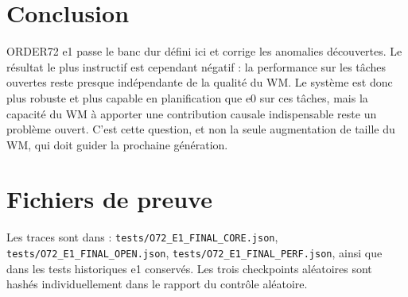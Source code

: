 \documentclass[11pt,a4paper]{article}
\begin{document}
\section{Conclusion}
ORDER72 e1 passe le banc dur défini ici et corrige les anomalies découvertes. Le résultat le plus instructif est cependant négatif : la performance sur les tâches ouvertes reste presque indépendante de la qualité du WM. Le système est donc plus robuste et plus capable en planification que e0 sur ces tâches, mais la capacité du WM à apporter une contribution causale indispensable reste un problème ouvert. C'est cette question, et non la seule augmentation de taille du WM, qui doit guider la prochaine génération.
\appendix
\section{Fichiers de preuve}
Les traces sont dans : \texttt{tests/O72\_E1\_FINAL\_CORE.json}, \texttt{tests/O72\_E1\_FINAL\_OPEN.json}, \texttt{tests/O72\_E1\_FINAL\_PERF.json}, ainsi que dans les tests historiques e1 conservés. Les trois checkpoints aléatoires sont hashés individuellement dans le rapport du contrôle aléatoire.
\end{document}
